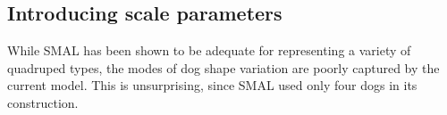 


\subsection{Introducing scale parameters}

While SMAL has been shown to be adequate for representing a variety of quadruped types, the modes of dog shape variation are poorly captured by the current model. This is unsurprising, since SMAL used only four dogs in its construction.

